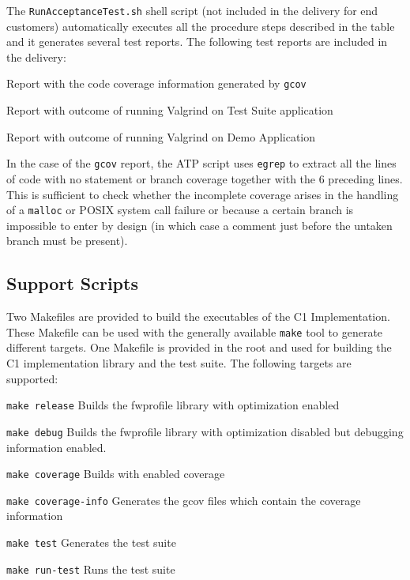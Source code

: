 \documentclass[manual]{../fwprofile}
\begin{document}
The \texttt{RunAcceptanceTest.sh} shell script (not included in the delivery for end customers) automatically executes all the procedure steps described in the table and it generates several test reports. The following test reports are included in the delivery:

\begin{fw_itemize}
\item Report with the code coverage information generated by \texttt{gcov}
\item Report with outcome of running Valgrind on Test Suite application
\item Report with outcome of running Valgrind on Demo Application
\end{fw_itemize}

In the case of the \texttt{gcov} report, the ATP script uses \texttt{egrep} to extract all the lines of code with no statement or branch coverage together with the 6 preceding lines. This is sufficient to check whether the incomplete coverage arises in the handling of a \texttt{malloc} or POSIX system call failure or because a certain branch is impossible to enter by design (in which case a comment just before the untaken branch must be present).

\subsection{Support Scripts}\label{ref:script}
Two Makefiles are provided to build the executables of the C1 Implementation. These Makefile can be used with the generally available \texttt{make} tool to generate different targets.
One Makefile is provided in the root and used for building the C1 implementation library and the test suite. The following targets are supported:
\begin{fw_itemize}
\item \texttt{make release} Builds the fwprofile library with optimization enabled
\item \texttt{make debug} Builds the fwprofile library with optimization disabled but debugging information enabled.
\item \texttt{make coverage} Builds with enabled coverage 
\item \texttt{make coverage-info} Generates the gcov files which contain the coverage information
\item \texttt{make test} Generates the test suite
\item \texttt{make run-test} Runs the test suite
\end{fw_itemize}
\end{document}
